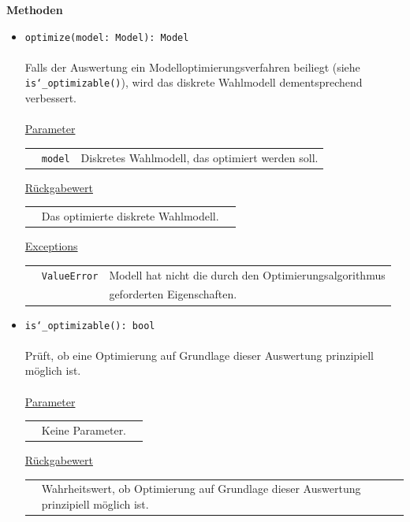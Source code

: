 \documentclass{article}
\begin{document}
\textbf{Methoden}
\begin{itemize}\setlength\itemsep{3em}
\item \texttt{optimize(model: Model): Model}\\\\
Falls der Auswertung ein Modelloptimierungsverfahren beiliegt (siehe \texttt{is\char`_optimizable()}), wird das diskrete Wahlmodell dementsprechend verbessert.\\\\
\underline{Parameter}\\
\begin{tabular}{lll}
 & \texttt{model} & Diskretes Wahlmodell, das optimiert werden soll.\\
\end{tabular}

\underline{Rückgabewert}\\
\begin{tabular}{lll}
 & Das optimierte diskrete Wahlmodell.\\
\end{tabular}

\underline{Exceptions}\\
\begin{tabular}{lll}
 & \texttt{ValueError} & Modell hat nicht die durch den Optimierungsalgorithmus\\
 && geforderten Eigenschaften.\\
\end{tabular}

\item \texttt{is\char`_optimizable(): bool}\\\\
Prüft, ob eine Optimierung auf Grundlage dieser Auswertung prinzipiell möglich ist.\\\\
\underline{Parameter}\\
\begin{tabular}{lll}
 & Keine Parameter.
\end{tabular}

\underline{Rückgabewert}\\
\begin{tabular}{lll}
 & Wahrheitswert, ob Optimierung auf Grundlage dieser Auswertung prinzipiell möglich ist.\\
\end{tabular}
\end{itemize}
\end{document}
